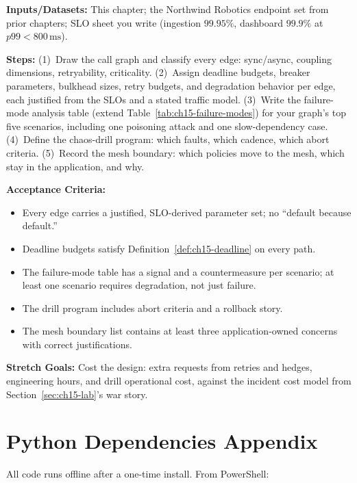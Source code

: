 \textbf{Inputs/Datasets:} This chapter; the Northwind Robotics endpoint set
from prior chapters; SLO sheet you write (ingestion $99.95\%$,
dashboard $99.9\%$ at $p99 < 800\,\mathrm{ms}$).

\textbf{Steps:} (1)~Draw the call graph and classify every edge: sync/async,
coupling dimensions, retryability, criticality. (2)~Assign deadline
budgets, breaker parameters, bulkhead sizes, retry budgets, and
degradation behavior per edge, each justified from the SLOs and a stated
traffic model. (3)~Write the failure-mode analysis table (extend
Table~\ref{tab:ch15-failure-modes}) for your graph's top five scenarios,
including one poisoning attack and one slow-dependency case. (4)~Define
the chaos-drill program: which faults, which cadence, which abort
criteria. (5)~Record the mesh boundary: which policies move to the mesh,
which stay in the application, and why.

\textbf{Acceptance Criteria:}
\begin{itemize}
  \item[$\square$] Every edge carries a justified, SLO-derived parameter
        set; no ``default because default.''
  \item[$\square$] Deadline budgets satisfy
        Definition~\ref{def:ch15-deadline} on every path.
  \item[$\square$] The failure-mode table has a signal and a countermeasure
        per scenario; at least one scenario requires degradation, not just
        failure.
  \item[$\square$] The drill program includes abort criteria and a
        rollback story.
  \item[$\square$] The mesh boundary list contains at least three
        application-owned concerns with correct justifications.
\end{itemize}

\textbf{Stretch Goals:} Cost the design: extra requests from retries and
hedges, engineering hours, and drill operational cost, against the
incident cost model from Section~\ref{sec:ch15-lab}'s war story.

\section{Python Dependencies Appendix}
\label{sec:ch15-deps}

All code runs offline after a one-time install. From PowerShell:

